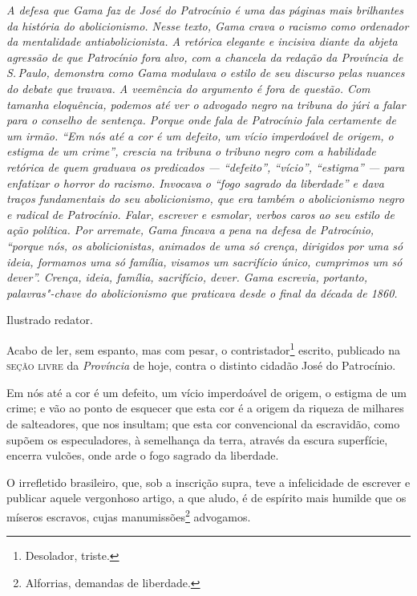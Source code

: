 \begin{flushleft}
{\footnotesize\itshape
A defesa que Gama faz de José do Patrocínio é uma das páginas mais
brilhantes da história do abolicionismo. Nesse texto, Gama crava o
racismo como ordenador da mentalidade antiabolicionista. A retórica
elegante e incisiva diante da abjeta agressão de que Patrocínio fora
alvo, com a chancela da redação da Província de S.\,Paulo, demonstra como
Gama modulava o estilo de seu discurso pelas nuances do debate que
travava. A veemência do argumento é fora de questão. Com tamanha
eloquência, podemos até ver o advogado negro na tribuna do júri a
falar para o conselho de sentença. Porque onde fala de Patrocínio fala
certamente de um irmão. ``Em nós até a cor é um defeito, um vício
imperdoável de origem, o estigma de um crime'', crescia na tribuna o
tribuno negro com a habilidade retórica de quem graduava os predicados
--- ``defeito'', ``vício'', ``estigma'' --- para enfatizar o horror do racismo.
Invocava o ``fogo sagrado da liberdade'' e dava traços fundamentais do seu
abolicionismo, que era também o abolicionismo negro e radical de Patrocínio.
Falar, escrever e esmolar, verbos caros ao seu estilo de ação política.
Por arremate, Gama fincava a pena na defesa de Patrocínio, ``porque nós,
os abolicionistas, animados de uma só crença, dirigidos por uma só
ideia, formamos uma só família, visamos um sacrifício único, cumprimos
um só dever''. Crença, ideia, família, sacrifício, dever. Gama escrevia,
portanto, palavras"-chave do abolicionismo que praticava desde o final da
década de 1860. }
\end{flushleft}


Ilustrado redator.

Acabo de ler, sem espanto, mas com pesar, o contristador\footnote{
  Desolador, triste.} escrito, publicado na \textsc{seção livre} da
\emph{Província} de hoje, contra o distinto cidadão José do Patrocínio.

Em nós até a cor é um defeito, um vício imperdoável de origem, o estigma
de um crime; e vão ao ponto de esquecer que esta cor é a origem da
riqueza de milhares de salteadores, que nos insultam; que esta cor
convencional da escravidão, como supõem os especuladores, à semelhança
da terra, através da escura superfície, encerra vulcões, onde arde o
fogo sagrado da liberdade.

O irrefletido brasileiro, que, sob a inscrição supra, teve a
infelicidade de escrever e publicar aquele vergonhoso artigo, a que
aludo, é de espírito mais humilde que os míseros escravos, cujas
manumissões\footnote{Alforrias, demandas de liberdade.} advogamos.

